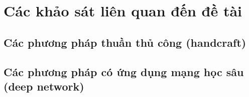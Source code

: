 \section{Các khảo sát liên quan đến đề tài}
\subsection{Các phương pháp thuần thủ công (handcraft)}
\subsection{Các phương pháp có ứng dụng mạng học sâu (deep network)}

